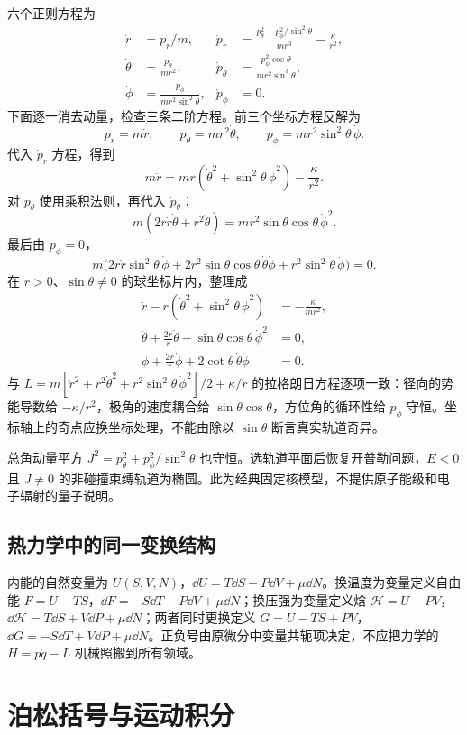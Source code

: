 \documentclass[UTF8,zihao=-4,fontset=fandol,a4paper]{ctexart}
\begin{document}
六个正则方程为
\begin{align*}
\dot r&=p_r/m,&\dot p_r&=\frac{p_\theta^2+p_\phi^2/\sin^2\theta}{mr^3}-\frac\kappa{r^2},\\
\dot\theta&=\frac{p_\theta}{mr^2},&\dot p_\theta&=\frac{p_\phi^2\cos\theta}{mr^2\sin^3\theta},\\
\dot\phi&=\frac{p_\phi}{mr^2\sin^2\theta},&\dot p_\phi&=0.
\end{align*}
下面逐一消去动量，检查三条二阶方程。前三个坐标方程反解为
\[
p_r=m\dot r,\qquad p_\theta=mr^2\dot\theta,\qquad
p_\phi=mr^2\sin^2\theta\,\dot\phi.
\]
代入 $\dot p_r$ 方程，得到
\[
m\ddot r=mr(\dot\theta^2+\sin^2\theta\,\dot\phi^2)-\frac{\kappa}{r^2}.
\]
对 $p_\theta$ 使用乘积法则，再代入 $\dot p_\theta$：
\[
m(2r\dot r\dot\theta+r^2\ddot\theta)
=mr^2\sin\theta\cos\theta\,\dot\phi^2.
\]
最后由 $\dot p_\phi=0$，
\[
m\bigl(2r\dot r\sin^2\theta\,\dot\phi
+2r^2\sin\theta\cos\theta\,\dot\theta\dot\phi
+r^2\sin^2\theta\,\ddot\phi\bigr)=0.
\]
在 $r>0$、$\sin\theta\ne0$ 的球坐标片内，整理成
\begin{align*}
\ddot r-r(\dot\theta^2+\sin^2\theta\,\dot\phi^2)&=-\frac{\kappa}{mr^2},\\
\ddot\theta+\frac{2\dot r}{r}\dot\theta-\sin\theta\cos\theta\,\dot\phi^2&=0,\\
\ddot\phi+\frac{2\dot r}{r}\dot\phi+2\cot\theta\,\dot\theta\dot\phi&=0.
\end{align*}
与 $L=m[\dot r^2+r^2\dot\theta^2+r^2\sin^2\theta\,\dot\phi^2]/2+\kappa/r$ 的拉格朗日方程逐项一致：径向的势能导数给 $-\kappa/r^2$，极角的速度耦合给 $\sin\theta\cos\theta$，方位角的循环性给 $p_\phi$ 守恒。坐标轴上的奇点应换坐标处理，不能由除以 $\sin\theta$ 断言真实轨道奇异。

总角动量平方 $J^2=p_\theta^2+p_\phi^2/\sin^2\theta$ 也守恒。选轨道平面后恢复开普勒问题，$E<0$ 且 $J\ne0$ 的非碰撞束缚轨道为椭圆。此为经典固定核模型，不提供原子能级和电子辐射的量子说明。
\subsection{热力学中的同一变换结构}
内能的自然变量为 $U(S,V,N)$，$\dd U=T\dd S-P\dd V+\mu\dd N$。换温度为变量定义自由能 $F=U-TS$，$\dd F=-S\dd T-P\dd V+\mu\dd N$；换压强为变量定义焓 $\mathcal H=U+PV$，$\dd\mathcal H=T\dd S+V\dd P+\mu\dd N$；两者同时更换定义 $G=U-TS+PV$，$\dd G=-S\dd T+V\dd P+\mu\dd N$。正负号由原微分中变量共轭项决定，不应把力学的 $H=p\dot q-L$ 机械照搬到所有领域。

\section{泊松括号与运动积分}\label{sec:poisson}
\end{document}

